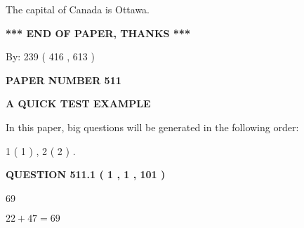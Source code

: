 \documentclass[12pt]{article}
\begin{document}
 
The capital of Canada is Ottawa.
 
 
 
 
   
   
 \vspace{0.2in}
 
   
   
   
   
\vspace{1.0in} 
{\textbf{\large{ *** END OF PAPER, THANKS *** }}} 
   
   
\hspace{1.0in} By: 
 239 ( 416 ,  613 )
   
   
   
   
\newpage 
\setcounter{page}{ 
   511001 } 
   
   
   
   
 {\textbf{ \Large{ PAPER NUMBER  511  }}}
   
   
\vspace{0.2in}
   
   
   
   
   
   
 \vspace{0.2in}
{\LARGE {\textbf{ A QUICK TEST EXAMPLE}}}
   
   
   
\vspace{0.2in}
   
In this paper, big questions will be generated in the following order: 
   
   
   1 ( 1 )
 ,
   2 ( 2 )
 .
  
\vspace{0.2in}
  
{\textbf{\Large{QUESTION
511.1 
 ( 1 , 1 , 101 )
}}}
  
  
 
 
\noindent{}

69
 
 
 
 
\noindent{}

$ %
22 +  %
47=   %
69$
 
 
  
\vspace{0.2in}
  
\end{document}
